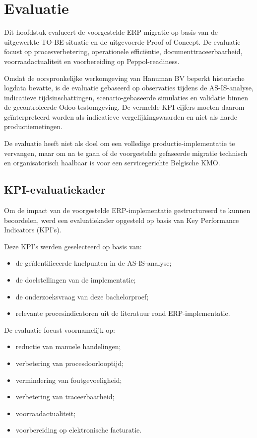 
\chapter{Evaluatie}
\label{ch:evaluatie}

Dit hoofdstuk evalueert de voorgestelde ERP-migratie op basis van de uitgewerkte TO-BE-situatie en de uitgevoerde Proof of Concept. De evaluatie focust op procesverbetering, operationele efficiëntie, documenttraceerbaarheid, voorraadactualiteit en voorbereiding op Peppol-readiness.

Omdat de oorspronkelijke werkomgeving van Hanuman BV beperkt historische logdata bevatte, is de evaluatie gebaseerd op observaties tijdens de AS-IS-analyse, indicatieve tijdsinschattingen, scenario-gebaseerde simulaties en validatie binnen de gecontroleerde Odoo-testomgeving. De vermelde KPI-cijfers moeten daarom geïnterpreteerd worden als indicatieve vergelijkingswaarden en niet als harde productiemetingen.

De evaluatie heeft niet als doel om een volledige productie-implementatie te vervangen, maar om na te gaan of de voorgestelde gefaseerde migratie technisch en organisatorisch haalbaar is voor een servicegerichte Belgische KMO.

\section{KPI-evaluatiekader}
\label{sec:kpi-evaluatiekader}

Om de impact van de voorgestelde ERP-implementatie gestructureerd te kunnen beoordelen, werd een evaluatiekader opgesteld op basis van Key Performance Indicators (KPI's).

Deze KPI's werden geselecteerd op basis van:
\begin{itemize}
    \item de geïdentificeerde knelpunten in de AS-IS-analyse;
    \item de doelstellingen van de implementatie;
    \item de onderzoeksvraag van deze bachelorproef;
    \item relevante procesindicatoren uit de literatuur rond ERP-implementatie.
\end{itemize}

De evaluatie focust voornamelijk op:
\begin{itemize}
    \item reductie van manuele handelingen;
    \item verbetering van procesdoorlooptijd;
    \item vermindering van foutgevoeligheid;
    \item verbetering van traceerbaarheid;
    \item voorraadactualiteit;
    \item voorbereiding op elektronische facturatie.
\end{itemize}

